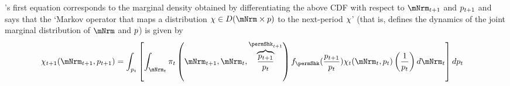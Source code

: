 \documentclass[\econtexRoot/BufferStockTheory]{subfiles}
\begin{document}
\cite{harmenbergInvariant}'s first equation corresponds to the marginal density obtained by differentiating the above CDF with respect to $\mNrmNxt$ and $p_{t+1}$ and says that the `Markov operator that maps a distribution $\mpPrb \in D(\mNrm \times \permLvlPrb)$ to the next-period $\chi$' (that is, defines the dynamics of the joint marginal distribution of $\mNrm$ and $p$) is given by
\begin{equation}\begin{gathered}\begin{aligned} \label{eq:MeasTrnst}
\mpPrb_{t+1}(\mNrmNxt,\permLvlPrbNxt) & =
                                          \int_{\permLvlPrbNow} \left[
                                           \int_{\mNrmNow} \lomdkPrb_{t}\left(\mNrmNxt,\mNrmNow,
                                           \overbrace{\frac{\permLvlPrbNxt}{\PermGroFac \permLvlPrbNow}}^{\permShkPrbNxt}\right)\permShkRawPrb(\frac{\permLvlPrbNxt}{\PermGroFac \permLvlPrbNow})\mpPrb_{t}(\mNrmNow,\permLvlPrbNow)\left(\frac{1}{\PermGroFac \permLvlPrbNow}\right)  d \mNrmNow
                                          \right] d \permLvlPrbNow
\end{aligned}\end{gathered}\end{equation}
\newcommand{\nPermShk}{\texttt{i}}\newcommand{\nmNrmVecNow}{\texttt{j}}\newcommand{\nmNrmVecNxt}{\texttt{k}}\newcommand{\permLvlNow}{\texttt{n}}\newcommand{\npermLvlNxt}{\texttt{q}}
\newcommand{\npermLvlNow}{\digamma} %
\newcommand{\npermLvlVecNow}{\texttt{n}}\newcommand{\npermLvlVecNxt}{\texttt{q}}\newcommand{\nPermShkNxtFunc}{\iota(\npermLvlVecNow,\npermLvlVecNxt)}\newcommand{\nPermShkVecNxt}{\texttt{i}}
\newcommand{\mNrmVecNow}{\mNrmVec_{t}^{\nmNrmVecNow}}
\newcommand{\mNrmVecNxt}{\mNrmVec_{t+1}^{\nmNrmVecNxt}}
\newcommand{\permShkVecNxt}{\permShk_{t+1}^{\nPermShkVecNxt}}
\newcommand{\permShkVecNow}{\permShk_{t}^{\nPermShkVecNow}}
\renewcommand{\permLvlNow}{\permLvlPrb_{t}}
\newcommand{\permLvlNxt}{\permLvlPrb_{t+1}}
\newcommand{\permLvlVecNow}{\permLvlVec_{t}^{\npermLvlVecNow}}
\newcommand{\permLvlVecNxt}{\permLvlVec_{t+1}^{\npermLvlVecNxt}}
\end{document}

